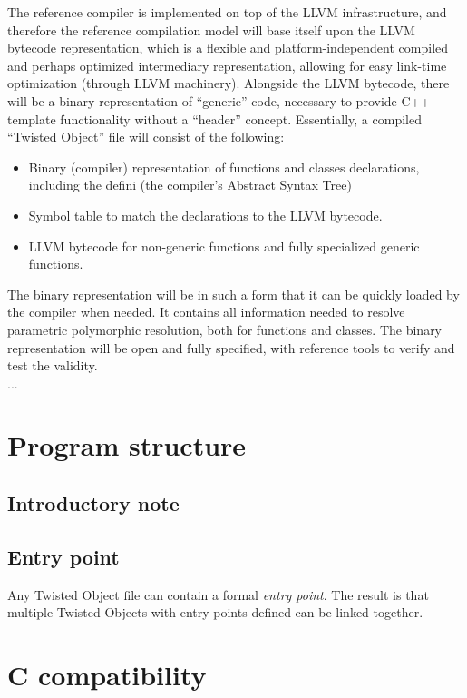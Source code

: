 \documentclass[a4paper,11pt]{report}
\begin{document}
The reference compiler is implemented on top of the LLVM infrastructure, and therefore the reference compilation model will base itself upon the LLVM bytecode representation, which is a flexible and platform-independent compiled and perhaps optimized intermediary representation, allowing for easy link-time optimization (through LLVM machinery).
Alongside the LLVM bytecode, there will be a binary representation of “generic” code, necessary to provide C++ template functionality without a “header” concept.
Essentially, a compiled “Twisted Object” file will consist of the following:
\begin{itemize}
  \item Binary (compiler) representation of functions and classes declarations, including the defini (the compiler’s Abstract Syntax Tree)
  \item Symbol table to match the declarations to the LLVM bytecode.
  \item LLVM bytecode for non-generic functions and fully specialized generic functions.
\end{itemize}
The binary representation will be in such a form that it can be quickly loaded by the compiler when needed.
It contains all information needed to resolve parametric polymorphic resolution, both for functions and classes.
The binary representation will be open and fully specified, with reference tools to verify and test the validity.
\\ ...

\section{Program structure}
  \subsection{Introductory note}


  \subsection{Entry point}

Any Twisted Object file can contain a formal \emph{entry point}.
The result is that multiple Twisted Objects with entry points defined can be linked together. 

\section{C compatibility} \label{sec:c_compatibility}
\end{document}
